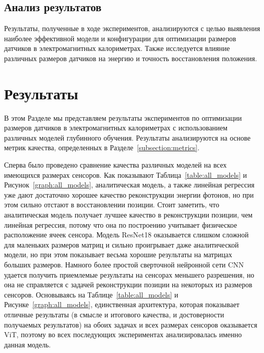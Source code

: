 \documentclass[a4paper,12pt]{extarticle}
\begin{document}
\subsection{Анализ результатов}

Результаты, полученные в ходе экспериментов, анализируются с целью выявления наиболее эффективной модели и конфигурации для оптимизации размеров датчиков в электромагнитных калориметрах. Также исследуется влияние различных размеров датчиков на энергию и точность восстановления положения.

\section{Результаты}
\label{section:results}

В этом Разделе мы представляем результаты экспериментов по оптимизации размеров датчиков в электромагнитных калориметрах с использованием различных моделей глубинного обучения. Результаты анализируются на основе метрик качества, определенных в Разделе~\ref{subsection:metrics}.

Сперва было проведено сравнение качества различных моделей на всех имеющихся размерах сенсоров. Как показывают Таблица~\ref{table:all_models} и Рисунок~\ref{graph:all_models}, аналитическая модель, а также линейная регрессия уже дают достаточно хорошее качество реконструкции энергии фотонов, но при этом сильно отстают в восстановлении позиции. Стоит заметить, что аналитическая модель получает лучшее качество в реконструкции позиции, чем линейная регрессия, потому что она по построению учитывает физическое расположение ячеек сенсора. Модель \textsf{ResNet18} оказывается слишком сложной для маленьких размеров матриц и сильно проигрывает даже аналитической модели, но при этом показывает весьма хорошие результаты на матрицах больших размеров. Намного более простой сверточной нейронной сети \textsf{CNN} удается получить приемлемые результаты на сенсорах меньшего разрешения, но она не справляется с задачей реконструкции позиции на некоторых из размеров сенсоров. Основываясь на Таблице~\ref{table:all_models} и Рисунке~\ref{graph:all_models}, единственная архитектура, которая показывает отличные результаты (в смысле и итогового качества, и достоверности получаемых результатов) на обоих задачах и всех размерах сенсоров оказывается \textsf{ViT}, поэтому во всех последующих экспериментах анализировалась именно данная модель.
\end{document}
